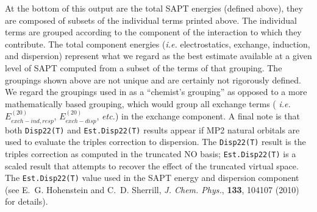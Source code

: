 At the bottom of this output are the total SAPT energies (defined above),
they are composed of subsets of the individual terms printed above. The
individual terms are grouped according to the component of the interaction
to which they contribute. The total component energies ({\em i.e.}
electrostatics, exchange, induction, and dispersion) represent what we
regard as the best estimate available at a given level of SAPT computed
from a subset of the terms of that grouping. The groupings shown above are
not unique and are certainly not rigorously defined. We regard the groupings 
used in \PSIfour\/ as a ``chemist's grouping'' as opposed to a more
mathematically based grouping, which would group all exchange terms ({\em
i.e.} $E_{exch-ind,resp}^{(20)}$, $E_{exch-disp}^{(20)}$, {\em etc.}) in
the exchange component. A final note is that both \texttt{Disp22(T)}
and \texttt{Est.Disp22(T)} results appear if MP2 natural orbitals are 
used to evaluate the triples correction to dispersion. The \texttt{Disp22(T)} 
result is the triples correction as computed in the truncated NO basis;  
\texttt{Est.Disp22(T)} is a scaled result that attempts to recover
the effect of the truncated virtual space. The \texttt{Est.Disp22(T)}
value used in the SAPT energy and dispersion component (see E.~G.
Hohenstein and C.~D. Sherrill, {\em J. Chem. Phys.}, {\bf 133}, 104107 
(2010) for details).
